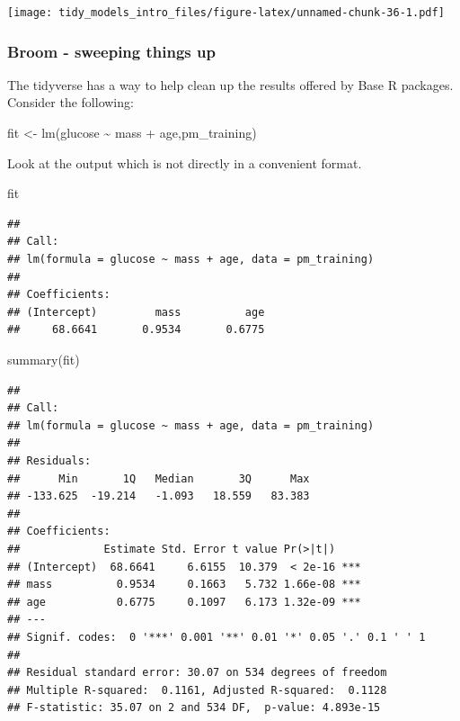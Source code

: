 \documentclass[
]{article}
\newenvironment{Shaded}{\begin{snugshade}}{\end{snugshade}}
\newcommand{\FunctionTok}[1]{\textcolor[rgb]{0.00,0.00,0.00}{#1}}
\newcommand{\NormalTok}[1]{#1}
\newcommand{\OtherTok}[1]{\textcolor[rgb]{0.56,0.35,0.01}{#1}}
\newcommand{\SpecialCharTok}[1]{\textcolor[rgb]{0.00,0.00,0.00}{#1}}
\begin{document}
\texttt{[image: tidy\_models\_intro\_files/figure-latex/unnamed-chunk-36-1.pdf]}

\hypertarget{broom---sweeping-things-up}{%
\subsubsection{Broom - sweeping things
up}\label{broom---sweeping-things-up}}

The tidyverse has a way to help clean up the results offered by Base R
packages. Consider the following:

\begin{Shaded}
\begin{Highlighting}[]
\NormalTok{fit }\OtherTok{\textless{}{-}} \FunctionTok{lm}\NormalTok{(glucose }\SpecialCharTok{\textasciitilde{}}\NormalTok{ mass }\SpecialCharTok{+}\NormalTok{ age,pm\_training)}
\end{Highlighting}
\end{Shaded}

Look at the output which is not directly in a convenient format.

\begin{Shaded}
\begin{Highlighting}[]
\NormalTok{fit}
\end{Highlighting}
\end{Shaded}

\begin{verbatim}
## 
## Call:
## lm(formula = glucose ~ mass + age, data = pm_training)
## 
## Coefficients:
## (Intercept)         mass          age  
##     68.6641       0.9534       0.6775
\end{verbatim}

\begin{Shaded}
\begin{Highlighting}[]
\FunctionTok{summary}\NormalTok{(fit)}
\end{Highlighting}
\end{Shaded}

\begin{verbatim}
## 
## Call:
## lm(formula = glucose ~ mass + age, data = pm_training)
## 
## Residuals:
##      Min       1Q   Median       3Q      Max 
## -133.625  -19.214   -1.093   18.559   83.383 
## 
## Coefficients:
##             Estimate Std. Error t value Pr(>|t|)    
## (Intercept)  68.6641     6.6155  10.379  < 2e-16 ***
## mass          0.9534     0.1663   5.732 1.66e-08 ***
## age           0.6775     0.1097   6.173 1.32e-09 ***
## ---
## Signif. codes:  0 '***' 0.001 '**' 0.01 '*' 0.05 '.' 0.1 ' ' 1
## 
## Residual standard error: 30.07 on 534 degrees of freedom
## Multiple R-squared:  0.1161, Adjusted R-squared:  0.1128 
## F-statistic: 35.07 on 2 and 534 DF,  p-value: 4.893e-15
\end{verbatim}
\end{document}
